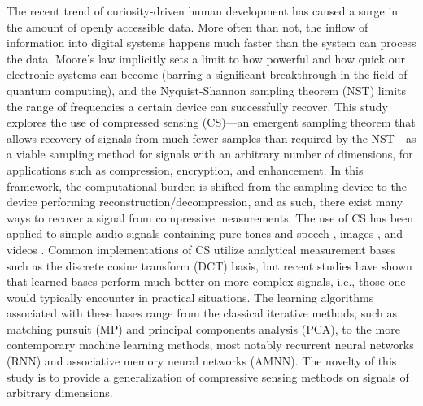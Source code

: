The recent trend of curiosity-driven human development has caused a surge in the amount of openly accessible data. More often than not, the inflow of information into digital systems happens much faster than the system can process the data. Moore's law implicitly sets a limit to how powerful and how quick our electronic systems can become (barring a significant breakthrough in the field of quantum computing), and the Nyquist-Shannon sampling theorem (NST) limits the range of frequencies a certain device can successfully recover. This study explores the use of compressed sensing (CS)---an emergent sampling theorem that allows recovery of signals from much fewer samples than required by the NST---as a viable sampling method for signals with an arbitrary number of dimensions, for applications such as compression, encryption, and enhancement. In this framework, the computational burden is shifted from the sampling device to the device performing reconstruction/decompression, and as such, there exist many ways to recover a signal from compressive measurements. The use of CS has been applied to simple audio signals containing pure tones \cite{Mathew2016,Andras2018} and speech \cite{Low2013,Low2018,Abrol2015}, images \cite{Mo2013,Zhou2016,Romero2016}, and videos \cite{Liu2014,Chen2014}. Common implementations of CS utilize analytical measurement bases such as the discrete cosine transform (DCT) basis, but recent studies \cite{Liu2013,Sharma2018,Eslahi2016} have shown that learned bases perform much better on more complex signals, i.e., those one would typically encounter in practical situations. The learning algorithms associated with these bases range from the classical iterative methods, such as matching pursuit (MP) and principal components analysis (PCA), to the more contemporary machine learning methods, most notably recurrent neural networks (RNN) and associative memory neural networks (AMNN). The novelty of this study is to provide a generalization of compressive sensing methods on signals of arbitrary dimensions.


